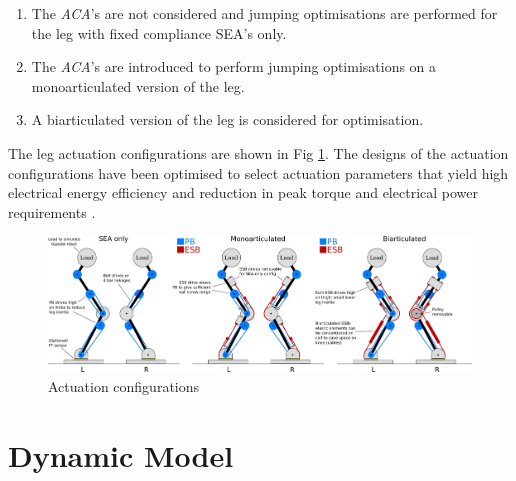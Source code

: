 \documentclass[letterpaper, 10 pt, conference]{ieeeconf}  %
\begin{document}
	\begin{enumerate}
		\item The \textit{ACA}'s are not considered and jumping optimisations are performed for the leg with fixed compliance SEA's only.
		\item The \textit{ACA}'s are introduced to perform jumping optimisations on a monoarticulated version of the leg. 
		\item A biarticulated version of the leg is considered for optimisation.
	\end{enumerate}
	The leg actuation configurations are shown in Fig \ref{fig:configurations}. The designs of the actuation configurations have been optimised to select actuation
	parameters that yield high electrical energy efficiency and reduction in peak torque and electrical power requirements \cite{roozing2016design}.
	
	
	
	\begin{figure}[ht]
		\centering
		\includegraphics[width=\linewidth]{3-DoF_leg_concept}
		\caption{Actuation configurations}
		\label{fig:configurations}
	\end{figure}
	
	\section{Dynamic Model} \label{sec:dynamicModel}
	
\end{document}
